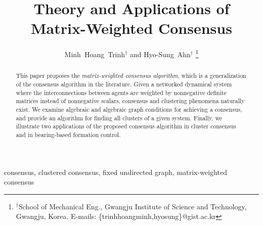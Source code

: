 \documentclass[draftclsnofoot,11pt,onecolumn]{IEEEtran}
\begin{document}
\title{Theory and Applications of Matrix-Weighted Consensus}
%
\author{Minh~Hoang~Trinh$^{\dag}$ 
and Hyo-Sung~Ahn$^{\dag}$
\thanks{\small $^{\dag}$School of Mechanical Eng., Gwangju Institute of Science and Technology, Gwangju, Korea.
{E-mails: \{trinhhoangminh,hyosung\}@gist.ac.kr}}
}

% 



%
% 





\maketitle

\begin{abstract}
This paper proposes the \emph{matrix-weighted consensus algorithm}, which is a generalization of the consensus algorithm in the literature. Given a networked dynamical system where the interconnections between agents are weighted by nonnegative definite matrices instead of nonnegative scalars, consensus and clustering phenomena naturally exist. We examine algebraic and algebraic graph conditions for achieving  a consensus, and provide an algorithm for finding all clusters of a given system. Finally, we illustrate two applications of the proposed consensus algorithm in cluster consensus and in bearing-based formation control.
\end{abstract}

\begin{IEEEkeywords}
consensus, clustered consensus, fixed undirected graph, matrix-weighted consensus
\end{IEEEkeywords}
\end{document}
